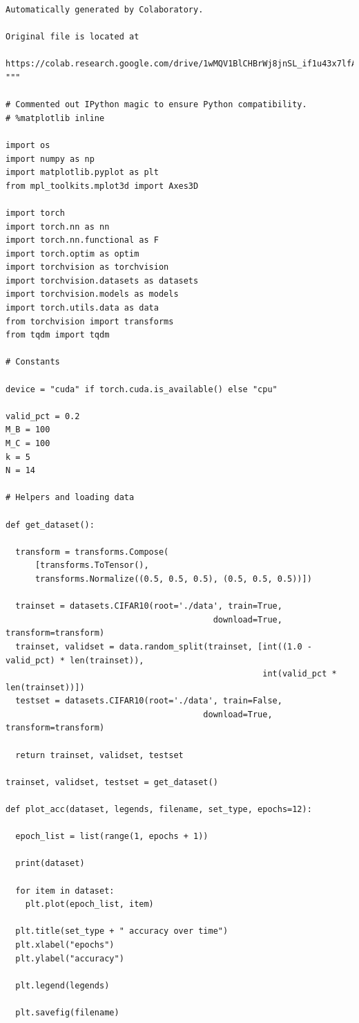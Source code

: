 \documentclass{article}
\newcommand{\1}{\mathbf{1}}
\begin{document}
{\begin{verbatim}
Automatically generated by Colaboratory.

Original file is located at
    https://colab.research.google.com/drive/1wMQV1BlCHBrWj8jnSL_if1u43x7lfAIO
"""

# Commented out IPython magic to ensure Python compatibility.
# %matplotlib inline

import os
import numpy as np
import matplotlib.pyplot as plt
from mpl_toolkits.mplot3d import Axes3D

import torch
import torch.nn as nn
import torch.nn.functional as F
import torch.optim as optim
import torchvision as torchvision
import torchvision.datasets as datasets
import torchvision.models as models
import torch.utils.data as data
from torchvision import transforms
from tqdm import tqdm

# Constants 

device = "cuda" if torch.cuda.is_available() else "cpu"

valid_pct = 0.2
M_B = 100
M_C = 100
k = 5
N = 14

# Helpers and loading data

def get_dataset():

  transform = transforms.Compose(
      [transforms.ToTensor(),
      transforms.Normalize((0.5, 0.5, 0.5), (0.5, 0.5, 0.5))])

  trainset = datasets.CIFAR10(root='./data', train=True,
                                          download=True, transform=transform)
  trainset, validset = data.random_split(trainset, [int((1.0 - valid_pct) * len(trainset)),
                                                    int(valid_pct * len(trainset))])
  testset = datasets.CIFAR10(root='./data', train=False,
                                        download=True, transform=transform)

  return trainset, validset, testset

trainset, validset, testset = get_dataset()

def plot_acc(dataset, legends, filename, set_type, epochs=12):

  epoch_list = list(range(1, epochs + 1))

  print(dataset)

  for item in dataset:
    plt.plot(epoch_list, item)

  plt.title(set_type + " accuracy over time")
  plt.xlabel("epochs")
  plt.ylabel("accuracy")
  
  plt.legend(legends)

  plt.savefig(filename)


\end{verbatim}}
\end{document}
